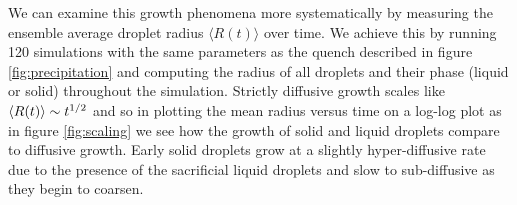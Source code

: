 We can examine this growth phenomena more systematically by measuring the
ensemble average droplet radius $\langle R(t) \rangle$ over time. We achieve
this by running 120 simulations with the same parameters as the quench
described in figure \ref{fig:precipitation} and computing the radius of all
droplets and their phase (liquid or solid) throughout the simulation. Strictly
diffusive growth scales like $\left\langle R(t) \right\rangle \sim t^{1/2}$ and so in plotting the
mean radius versus time on a log-log plot as in figure \ref{fig:scaling} we see
how the growth of solid and liquid droplets compare to diffusive growth. Early
solid droplets grow at a slightly hyper-diffusive rate due to the presence of
the sacrificial liquid droplets and slow to sub-diffusive as they begin to
coarsen.

